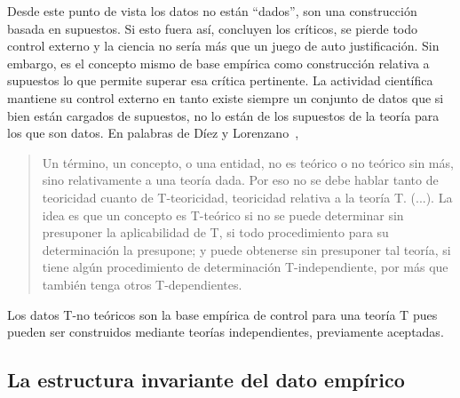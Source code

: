 \documentclass[a4paper,11pt]{book}
\theoremstyle{definition}
\begin{document}

Desde este punto de vista los datos no est\'an ``dados'', son una construcci\'on basada en supuestos.
%
Si esto fuera as\'i, concluyen los cr\'iticos, se pierde todo control externo y la ciencia no ser\'ia m\'as que un juego de auto justificaci\'on.
%
Sin embargo, es el concepto mismo de base emp\'irica como construcci\'on relativa a supuestos lo que permite superar esa cr\'itica pertinente.
%
La actividad cient\'ifica mantiene su control externo en tanto existe siempre un conjunto de datos que si bien est\'an cargados de supuestos, no lo est\'an de los supuestos de la teor\'ia para los que son datos.
%
En palabras de D\'iez y Lorenzano~\cite{lorenzano2002-concepcionEstructuralista},
%
\begin{quotation}
Un t\'ermino, un concepto, o una entidad, no es te\'orico o no te\'orico sin m\'as, sino relativamente a una teor\'ia dada.
Por eso no se debe hablar tanto de teoricidad cuanto de T-teoricidad, teoricidad relativa a la teor\'ia T. (...).
La idea es que un concepto es T-te\'orico si no se puede determinar sin presuponer la aplicabilidad de T, si todo procedimiento para su determinaci\'on la presupone; y puede obtenerse sin presuponer tal teor\'ia, si tiene alg\'un procedimiento de determinaci\'on T-independiente, por m\'as que tambi\'en tenga otros T-dependientes.
\end{quotation}
%
Los datos T-no te\'oricos son la base emp\'irica de control para una teor\'ia T pues pueden ser construidos mediante teor\'ias independientes, previamente aceptadas.



\subsection{La estructura invariante del dato emp\'irico} \label{sec:estructura_invariante}
\end{document}
